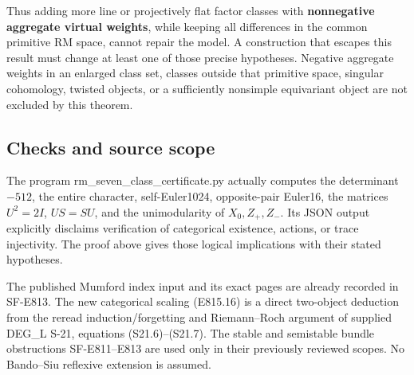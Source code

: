 Thus adding more line or projectively flat factor classes with
\textbf{nonnegative aggregate virtual weights}, while keeping all
differences in the common primitive RM space, cannot repair the model. A
construction that escapes this result must change at least one of those
precise hypotheses. Negative aggregate weights in an enlarged class set,
classes outside that primitive space, singular cohomology, twisted
objects, or a sufficiently nonsimple equivariant object are not excluded
by this theorem.

\subsection{Checks and source scope}\label{SF-E815-checks-and-source-scope}

The program rm\_seven\_class\_certificate.py actually computes the
determinant \(-512\), the entire character, self-Euler1024,
opposite-pair Euler16, the matrices \(U^2=2I\), \(US=SU\), and the
unimodularity of \(X_0,Z_+,Z_-\). Its JSON output explicitly disclaims
verification of categorical existence, actions, or trace injectivity.
The proof above gives those logical implications with their stated
hypotheses.

The published Mumford index input and its exact pages are already
recorded in SF-E813. The new categorical scaling (E815.16) is a direct
two-object deduction from the reread induction/forgetting and
Riemann--Roch argument of supplied DEG\_L S-21, equations
(S21.6)--(S21.7). The stable and semistable bundle obstructions
SF-E811--E813 are used only in their previously reviewed scopes. No
Bando--Siu reflexive extension is assumed.
